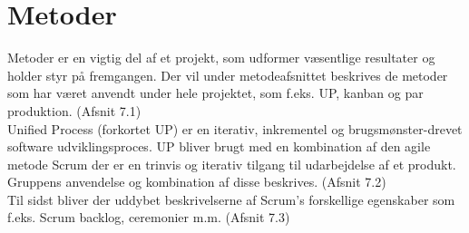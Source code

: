 \chapter{Metoder}
Metoder er en vigtig del af et projekt, som udformer væsentlige resultater og holder styr på fremgangen. Der vil under metodeafsnittet beskrives de metoder som har været anvendt under hele projektet, som f.eks. UP, kanban og par produktion. (Afsnit 7.1) \\
Unified Process (forkortet UP) er en iterativ, inkrementel og brugsmønster-drevet software udviklingsproces. UP bliver brugt med en kombination af den agile metode Scrum der er en trinvis og iterativ tilgang til udarbejdelse af et produkt. Gruppens anvendelse og kombination af disse beskrives. (Afsnit 7.2) \\
Til sidst bliver der uddybet beskrivelserne af Scrum’s forskellige egenskaber som f.eks. Scrum backlog, ceremonier m.m. (Afsnit 7.3) \\

